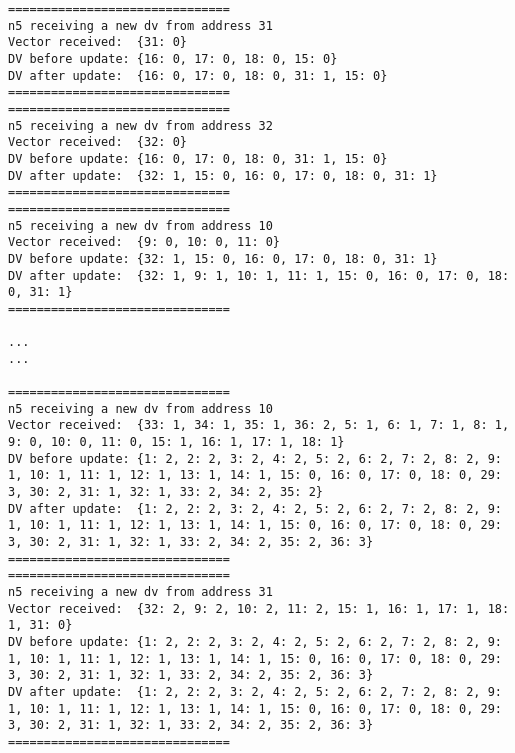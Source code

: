 \documentclass[11pt]{article}
\begin{document}
 \begin{lstlisting} 
===============================
n5 receiving a new dv from address 31
Vector received:  {31: 0}
DV before update: {16: 0, 17: 0, 18: 0, 15: 0}
DV after update:  {16: 0, 17: 0, 18: 0, 31: 1, 15: 0}
===============================
===============================
n5 receiving a new dv from address 32
Vector received:  {32: 0}
DV before update: {16: 0, 17: 0, 18: 0, 31: 1, 15: 0}
DV after update:  {32: 1, 15: 0, 16: 0, 17: 0, 18: 0, 31: 1}
===============================
===============================
n5 receiving a new dv from address 10
Vector received:  {9: 0, 10: 0, 11: 0}
DV before update: {32: 1, 15: 0, 16: 0, 17: 0, 18: 0, 31: 1}
DV after update:  {32: 1, 9: 1, 10: 1, 11: 1, 15: 0, 16: 0, 17: 0, 18: 0, 31: 1}
===============================

...
...

===============================
n5 receiving a new dv from address 10
Vector received:  {33: 1, 34: 1, 35: 1, 36: 2, 5: 1, 6: 1, 7: 1, 8: 1, 9: 0, 10: 0, 11: 0, 15: 1, 16: 1, 17: 1, 18: 1}
DV before update: {1: 2, 2: 2, 3: 2, 4: 2, 5: 2, 6: 2, 7: 2, 8: 2, 9: 1, 10: 1, 11: 1, 12: 1, 13: 1, 14: 1, 15: 0, 16: 0, 17: 0, 18: 0, 29: 3, 30: 2, 31: 1, 32: 1, 33: 2, 34: 2, 35: 2}
DV after update:  {1: 2, 2: 2, 3: 2, 4: 2, 5: 2, 6: 2, 7: 2, 8: 2, 9: 1, 10: 1, 11: 1, 12: 1, 13: 1, 14: 1, 15: 0, 16: 0, 17: 0, 18: 0, 29: 3, 30: 2, 31: 1, 32: 1, 33: 2, 34: 2, 35: 2, 36: 3}
===============================
===============================
n5 receiving a new dv from address 31
Vector received:  {32: 2, 9: 2, 10: 2, 11: 2, 15: 1, 16: 1, 17: 1, 18: 1, 31: 0}
DV before update: {1: 2, 2: 2, 3: 2, 4: 2, 5: 2, 6: 2, 7: 2, 8: 2, 9: 1, 10: 1, 11: 1, 12: 1, 13: 1, 14: 1, 15: 0, 16: 0, 17: 0, 18: 0, 29: 3, 30: 2, 31: 1, 32: 1, 33: 2, 34: 2, 35: 2, 36: 3}
DV after update:  {1: 2, 2: 2, 3: 2, 4: 2, 5: 2, 6: 2, 7: 2, 8: 2, 9: 1, 10: 1, 11: 1, 12: 1, 13: 1, 14: 1, 15: 0, 16: 0, 17: 0, 18: 0, 29: 3, 30: 2, 31: 1, 32: 1, 33: 2, 34: 2, 35: 2, 36: 3}
===============================
\end{lstlisting}
\end{document}
